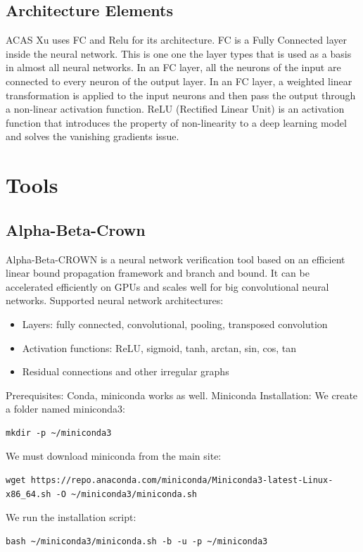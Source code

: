 \documentclass{article}
\begin{document}
\subsection{Architecture Elements}
ACAS Xu uses FC and Relu for its architecture.\newline
FC is a Fully Connected layer inside the neural network. This is one one the layer types that is used as a basis in almost all neural networks. In an FC layer, all the neurons of the input are connected to every neuron of the output layer. In an FC layer, a weighted linear transformation is applied to the input neurons and then pass the output through a non-linear activation function.
\newline
ReLU\cite{relu} (Rectified Linear Unit) is an activation function that introduces the property of non-linearity to a deep learning model and solves the vanishing gradients issue.
\newpage
\section{Tools}
\subsection{Alpha-Beta-Crown \cite{alpha-beta}}
Alpha-Beta-CROWN is a neural network verification tool based on an efficient linear bound propagation framework and branch and bound. It can be accelerated efficiently on GPUs and scales well for big convolutional neural networks.\newline
Supported neural network architectures:
\begin{itemize}
\item Layers: fully connected, convolutional, pooling, transposed convolution
\item Activation functions: ReLU, sigmoid, tanh, arctan, sin, cos, tan
\item Residual connections and other irregular graphs
\end{itemize}
\newline
Prerequisites: Conda, miniconda works as well.\newline
Miniconda Installation:
We create a folder named miniconda3:

\begin{verbatim}mkdir -p ~/miniconda3\end{verbatim}
We must download miniconda from the main site:
\begin{verbatim}wget https://repo.anaconda.com/miniconda/Miniconda3-latest-Linux-x86_64.sh -O ~/miniconda3/miniconda.sh\end{verbatim}
We run the installation script:
\begin{verbatim}bash ~/miniconda3/miniconda.sh -b -u -p ~/miniconda3
\end{verbatim}
\end{document}

